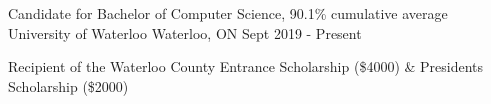
\begin{cventries}
  \cventry
    {Candidate for Bachelor of Computer Science, 90.1\% cumulative average} %
    {University of Waterloo} %
    {Waterloo, ON} %
    {Sept 2019 - Present} %
    {
      \begin{cvitems} %
         \item {Recipient of the Waterloo County Entrance Scholarship (\$4000) \& President\textquotesingle s Scholarship (\$2000)}
      \end{cvitems}
    }
\end{cventries}
